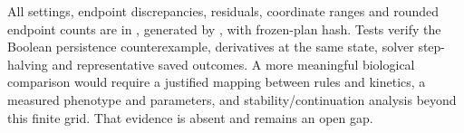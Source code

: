 All settings, endpoint discrepancies, residuals, coordinate ranges and rounded endpoint counts are in , generated by , with frozen-plan hash. Tests verify the Boolean persistence counterexample, derivatives at the same state, solver step-halving and representative saved outcomes. A more meaningful biological comparison would require a justified mapping between rules and kinetics, a measured phenotype and parameters, and stability/continuation analysis beyond this finite grid. That evidence is absent and remains an open gap.






